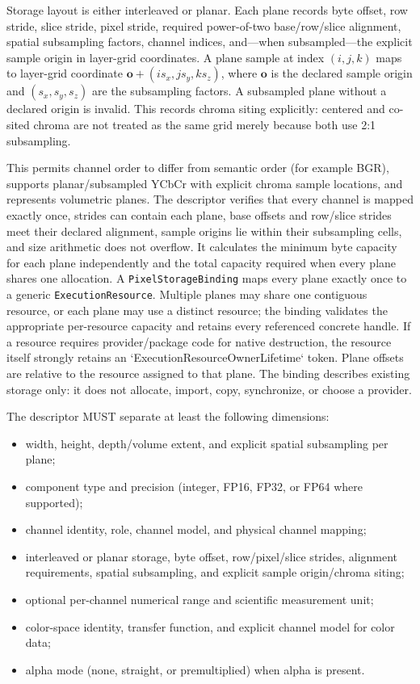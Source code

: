 \documentclass[11pt,a4paper,oneside]{article}
\begin{document}
Storage layout is either interleaved or planar. Each plane records byte offset, row stride, slice stride, pixel stride, required power-of-two base/row/slice alignment, spatial subsampling factors, channel indices, and—when subsampled—the explicit sample origin in layer-grid coordinates. A plane sample at index $(i,j,k)$ maps to layer-grid coordinate $\mathbf{o} + (i s_x,j s_y,k s_z)$, where $\mathbf{o}$ is the declared sample origin and $(s_x,s_y,s_z)$ are the subsampling factors. A subsampled plane without a declared origin is invalid. This records chroma siting explicitly: centered and co-sited chroma are not treated as the same grid merely because both use 2:1 subsampling.

This permits channel order to differ from semantic order (for example BGR), supports planar/subsampled YCbCr with explicit chroma sample locations, and represents volumetric planes. The descriptor verifies that every channel is mapped exactly once, strides can contain each plane, base offsets and row/slice strides meet their declared alignment, sample origins lie within their subsampling cells, and size arithmetic does not overflow. It calculates the minimum byte capacity for each plane independently and the total capacity required when every plane shares one allocation. A \texttt{PixelStorageBinding} maps every plane exactly once to a generic \texttt{ExecutionResource}. Multiple planes may share one contiguous resource, or each plane may use a distinct resource; the binding validates the appropriate per-resource capacity and retains every referenced concrete handle. If a resource requires provider/package code for native destruction, the resource itself strongly retains an `ExecutionResourceOwnerLifetime` token. Plane offsets are relative to the resource assigned to that plane. The binding describes existing storage only: it does not allocate, import, copy, synchronize, or choose a provider.

The descriptor MUST separate at least the following dimensions:
\begin{itemize}
  \item width, height, depth/volume extent, and explicit spatial subsampling per plane;
  \item component type and precision (integer, FP16, FP32, or FP64 where supported);
  \item channel identity, role, channel model, and physical channel mapping;
  \item interleaved or planar storage, byte offset, row/pixel/slice strides, alignment requirements, spatial subsampling, and explicit sample origin/chroma siting;
  \item optional per-channel numerical range and scientific measurement unit;
  \item color-space identity, transfer function, and explicit channel model for color data;
  \item alpha mode (none, straight, or premultiplied) when alpha is present.
\end{itemize}
\end{document}
